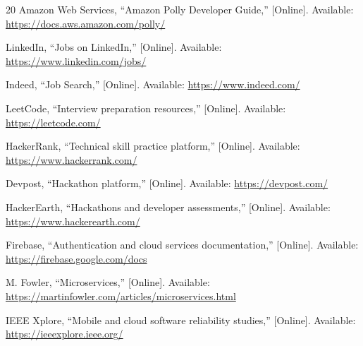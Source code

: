 \documentclass[conference]{IEEEtran}
\begin{document}
\begin{thebibliography}{20}
 Amazon Web Services, ``Amazon Polly Developer Guide,'' [Online]. Available: \url{https://docs.aws.amazon.com/polly/}

 LinkedIn, ``Jobs on LinkedIn,'' [Online]. Available: \url{https://www.linkedin.com/jobs/}

 Indeed, ``Job Search,'' [Online]. Available: \url{https://www.indeed.com/}

 LeetCode, ``Interview preparation resources,'' [Online]. Available: \url{https://leetcode.com/}

 HackerRank, ``Technical skill practice platform,'' [Online]. Available: \url{https://www.hackerrank.com/}

 Devpost, ``Hackathon platform,'' [Online]. Available: \url{https://devpost.com/}

 HackerEarth, ``Hackathons and developer assessments,'' [Online]. Available: \url{https://www.hackerearth.com/}

 Firebase, ``Authentication and cloud services documentation,'' [Online]. Available: \url{https://firebase.google.com/docs}

 M. Fowler, ``Microservices,'' [Online]. Available: \url{https://martinfowler.com/articles/microservices.html}

 IEEE Xplore, ``Mobile and cloud software reliability studies,'' [Online]. Available: \url{https://ieeexplore.ieee.org/}

\end{thebibliography}
\end{document}
